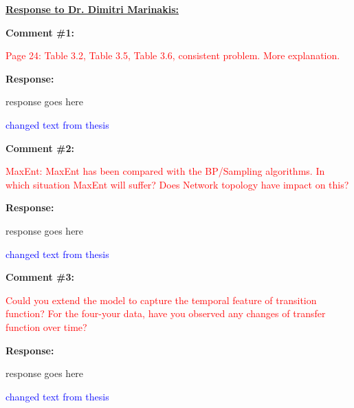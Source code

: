 \documentclass[journal]{IEEEtran}
\begin{document}
\vspace{50pt} 
  \Large
\noindent \textbf{\underline{Response to Dr. Dimitri Marinakis:}}
 \large
 
\vspace{10pt}
\textbf{Comment \#1:}
\begin{adjustwidth}{2.5em}{0pt}
\singlespacing \vspace{-10pt}
\textcolor{red}{Page 24: Table 3.2, Table 3.5, Table 3.6, consistent problem. More explanation.}
\end{adjustwidth}

\vspace{10pt}
\textbf{Response:}
\begin{adjustwidth}{2.5em}{0pt}
response goes here

\vspace{10pt}
\noindent\textcolor{blue}{changed text from thesis}
\end{adjustwidth}


\vspace{30pt}
\textbf{Comment \#2:}
\begin{adjustwidth}{2.5em}{0pt}
\singlespacing \vspace{-10pt}
\textcolor{red}{MaxEnt: MaxEnt has been compared with the BP/Sampling algorithms. In which situation MaxEnt will suffer? Does Network topology have impact on this?}
\end{adjustwidth}

\vspace{10pt}
\textbf{Response:}
\begin{adjustwidth}{2.5em}{0pt}
response goes here

\vspace{10pt}
\noindent\textcolor{blue}{changed text from thesis}
\end{adjustwidth}


\vspace{30pt}
\textbf{Comment \#3:}
\begin{adjustwidth}{2.5em}{0pt}
\singlespacing \vspace{-10pt}
\textcolor{red}{Could you extend the model to capture the temporal feature of transition function? For the four-your data, have you observed any changes of transfer function over time?}
\end{adjustwidth}

\vspace{10pt}
\textbf{Response:}
\begin{adjustwidth}{2.5em}{0pt}
response goes here

\vspace{10pt}
\noindent\textcolor{blue}{changed text from thesis}
\end{adjustwidth}
\end{document}

